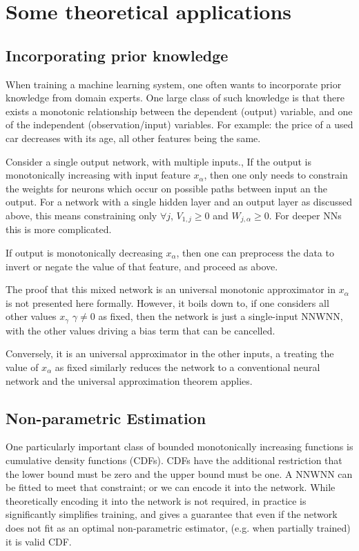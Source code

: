 \documentclass{article} %
\begin{document}
\section{Some theoretical applications}

\subsection{Incorporating prior knowledge}
When training a machine learning system,
one often wants to incorporate prior knowledge from domain experts.
One large class of such knowledge is that there exists a monotonic relationship between the dependent (output) variable, and one of the independent (observation/input) variables.
For example: the price of a used car decreases with its age, all other features being the same.

Consider a single output network, with multiple inputs.,
If the output is monotonically increasing with input feature $x_\alpha$,
then one only needs to constrain the weights for neurons which occur on possible paths between input an the output.
For a network with a single hidden layer  and an output layer as discussed above,
this means constraining only $\forall j$, $V_{1,j} \ge 0$ and $W_{j, \alpha} \ge 0$.
For deeper NNs this is more complicated. 

If output  is monotonically decreasing $x_\alpha$, then one can preprocess the data to invert or negate the value of that feature, and proceed as above.

The proof that this mixed network is an universal monotonic approximator in  $x_\alpha$ is not presented here formally.
However, it boils down to, if one considers all other values $x_\gamma$ $\gamma \ne 0$ as fixed, then the network is just a single-input NNWNN, with the other values driving a bias term that can be cancelled.

Conversely, it is an universal approximator in the other inputs,
a treating the value of $x_\alpha$ as fixed similarly reduces the network to a conventional neural network and the universal approximation theorem applies.




\subsection{Non-parametric Estimation}
One particularly important class of bounded monotonically increasing functions is
cumulative density functions (CDFs).
CDFs have the additional restriction that the lower bound must be zero and the upper bound must be one.
A NNWNN can be fitted to meet that constraint; or we can encode it into the network.
While theoretically encoding it into the network is not required,
in practice is significantly simplifies training,
and gives a guarantee that even if the network does not fit as an optimal non-parametric estimator, (e.g. when partially trained)
it is valid CDF.
\end{document}
